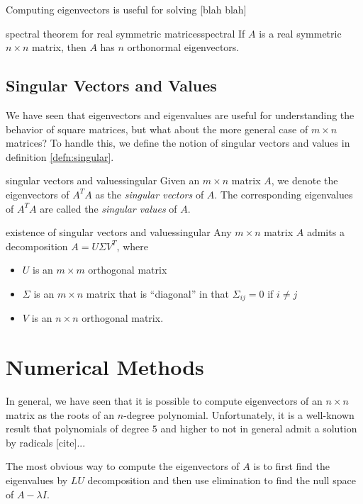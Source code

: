 \documentclass{article}
\begin{document}
Computing eigenvectors is useful for solving [blah blah]

\begin{theorem}{spectral theorem for real symmetric matrices}{spectral}
  If $A$ is a real symmetric $n \times n$ matrix, then $A$ has $n$ orthonormal eigenvectors.
\end{theorem}

\subsection{Singular Vectors and Values}
We have seen that eigenvectors and eigenvalues are useful for understanding the behavior of square matrices, but what about the more general case of $m \times n$ matrices? To handle this, we define the notion of singular vectors and values in definition \ref{defn:singular}.

\begin{definition}{singular vectors and values}{singular}
  Given an $m \times n$ matrix $A$, we denote the eigenvectors of $A^TA$ as the \textit{singular vectors} of $A$. The corresponding eigenvalues of $A^TA$ are called the \textit{singular values} of $A$.
\end{definition}

\begin{theorem}{existence of singular vectors and values}{singular}
  Any $m \times n$ matrix $A$ admits a decomposition $A = U \Sigma V^T$, where
  \begin{itemize}
    \item $U$ is an $m \times m$ orthogonal matrix
    \item $\Sigma$ is an $m \times n$ matrix that is ``diagonal'' in that $\Sigma_{ij} = 0$ if $i \neq j$
    \item $V$ is an $n \times n$ orthogonal matrix.
  \end{itemize}
\end{theorem}

\section{Numerical Methods}
In general, we have seen that it is possible to compute eigenvectors of an $n \times n$ matrix as the roots of an $n$-degree polynomial. Unfortunately, it is a well-known result that polynomials of degree $5$ and higher to not in general admit a solution by radicals [cite]...

The most obvious way to compute the eigenvectors of $A$ is to first find the eigenvalues by $LU$ decomposition and then use elimination to find the null space of $A - \lambda I$.
\end{document}

